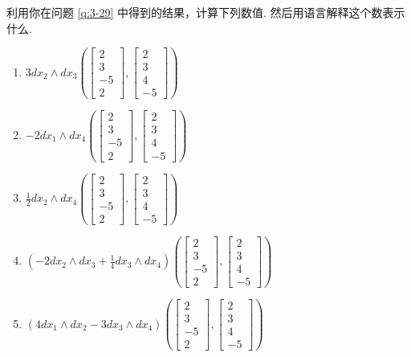 \begin{question}\label{q:3-30}
利用你在问题 \ref{q:3-29} 中得到的结果，计算下列数值. 然后用语言解释这个数表示什么.
\begin{enumerate}
  \item[(a)] $3dx_2\wedge dx_3\left(\begin{bmatrix}2\\3\\-5\\2\end{bmatrix},\begin{bmatrix}2\\3\\4\\-5\end{bmatrix}\right)$
  \item[(b)] $-2dx_1\wedge dx_4\left(\begin{bmatrix}2\\3\\-5\\2\end{bmatrix},\begin{bmatrix}2\\3\\4\\-5\end{bmatrix}\right)$
  \item[(c)] $\frac{1}{2}dx_2\wedge dx_4\left(\begin{bmatrix}2\\3\\-5\\2\end{bmatrix},\begin{bmatrix}2\\3\\4\\-5\end{bmatrix}\right)$
  \item[(d)] $\left(-2dx_2\wedge dx_3+\frac{1}{4}dx_3\wedge dx_4\right)\left(\begin{bmatrix}2\\3\\-5\\2\end{bmatrix},\begin{bmatrix}2\\3\\4\\-5\end{bmatrix}\right)$
  \item[(e)] $(4dx_1\wedge dx_2-3dx_3\wedge dx_4)\left(\begin{bmatrix}2\\3\\-5\\2\end{bmatrix},\begin{bmatrix}2\\3\\4\\-5\end{bmatrix}\right)$

\end{enumerate}
\end{question}
